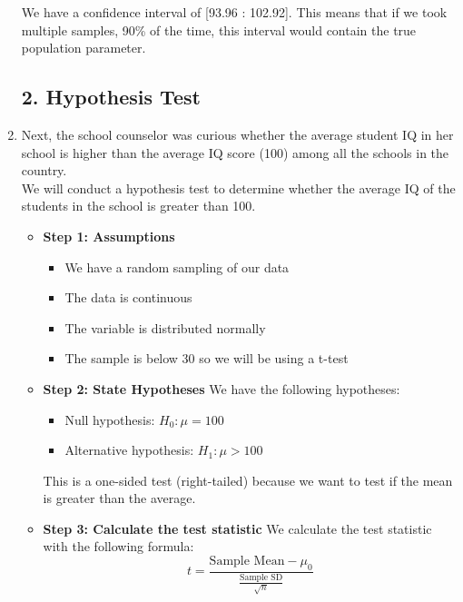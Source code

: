 \documentclass[12pt,letterpaper]{article}
\begin{document}
\begin{enumerate}
		We have a confidence interval of [93.96 : 102.92].  This means that if we took multiple samples, 90\% of the time, this interval would contain the true population parameter.
		
		\subsection*{2. Hypothesis Test}
		
		\item Next, the school counselor was curious whether the average student IQ in her school is higher than the average IQ score (100) among all the schools in the country.\\ 
		
		We will conduct a hypothesis test to determine whether the average IQ of the students in the school is greater than 100. 
		
		\begin{itemize}
			\item \textbf{Step 1: Assumptions} 
			\begin{itemize}
				\item We have a random sampling of our data
				\item The data is continuous
				\item The variable is distributed normally
				\item The sample is below 30 so we will be using a t-test
			\end{itemize}
		\end{itemize}
		
		\begin{itemize}
			\item \textbf{Step 2: State Hypotheses} 
			We have the following hypotheses:
			\begin{itemize}
				\item Null hypothesis: \( H_0: \mu = 100 \)
				\item Alternative hypothesis: \( H_1: \mu > 100 \)
			\end{itemize}
			This is a one-sided test (right-tailed) because we want to test if the mean is greater than the average.
		\end{itemize}
		
		\begin{itemize}
			\item \textbf{Step 3: Calculate the test statistic} We calculate the test statistic with the following formula:
			\[
			t = \frac{\text{Sample Mean} - \mu_0}{\frac{\text{Sample SD}}{\sqrt{n}}}
			\]
		\end{itemize}
		

\end{enumerate}
\end{document}
